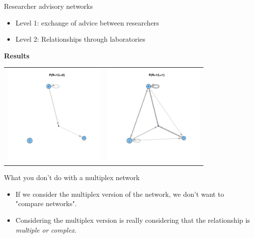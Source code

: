 \documentclass[compress,10pt]{beamer}
\begin{document}

 
\begin{frame}{Researcher advisory networks}
\begin{itemize}
\item Level 1: exchange of advice between researchers
\item Level 2: Relationships through laboratories
\end{itemize}
 
 \textbf{Results}
 
\begin{tabular}{cc} 
  \includegraphics [width = 5cm]{plots/pRL0.pdf} &
 \includegraphics [width =5cm]{plots/pRL1.pdf}
\end{tabular}

\end{frame}



\begin{frame}{What you don't do with a multiplex network}
\begin{itemize}
\item If we consider the multiplex version of the network, we don't want to "compare networks". 
\item Considering the multiplex version is really considering that the relationship is \emph{\textcolor{dgreen}{multiple or complex}}. 
\end{itemize}

\end{frame}
\end{document}
